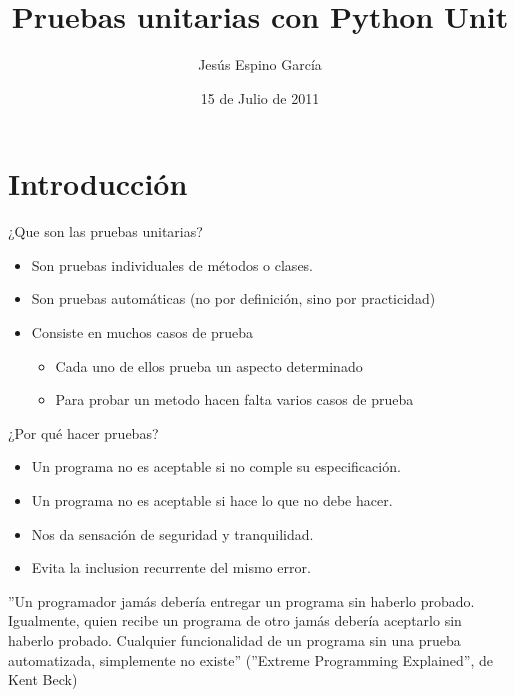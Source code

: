 \documentclass[10pt]{beamer}
\title{Pruebas unitarias con Python Unit}
\author{Jesús Espino García}
\date{15 de Julio de 2011}
\institute[Python Madrid 2011]{Kaleidos\\Python Madrid 2011}
\begin{document}
  \frame{\maketitle}


  \section*{Introducción}
  \begin{frame}{¿Que son las pruebas unitarias?}
    \begin{itemize}
      \item Son pruebas individuales de métodos o clases.
      \item Son pruebas automáticas (no por definición, sino por practicidad)
      \item Consiste en muchos casos de prueba
      \begin{itemize}
        \item Cada uno de ellos prueba un aspecto determinado
        \item Para probar un metodo hacen falta varios casos de prueba
      \end{itemize}
    \end{itemize}
  \end{frame}
  
  \begin{frame}{¿Por qué hacer pruebas?}
    \begin{itemize}
      \item Un programa no es aceptable si no comple su especificación.
      \item Un programa no es aceptable si hace lo que no debe hacer.
      \item Nos da sensación de seguridad y tranquilidad.
      \item Evita la inclusion recurrente del mismo error.
    \end{itemize}

    ''Un programador jamás debería entregar un programa sin haberlo probado. Igualmente, quien recibe un programa de otro jamás debería aceptarlo sin haberlo probado. Cualquier funcionalidad de un programa sin una prueba automatizada, simplemente no existe'' (''Extreme Programming Explained'', de Kent Beck)
  \end{frame}
  
\end{document}
